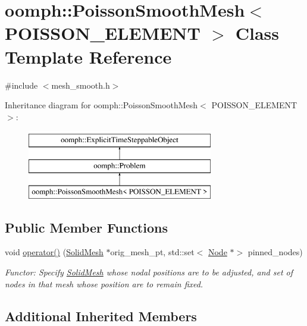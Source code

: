 \hypertarget{classoomph_1_1PoissonSmoothMesh}{}\section{oomph\+:\+:Poisson\+Smooth\+Mesh$<$ P\+O\+I\+S\+S\+O\+N\+\_\+\+E\+L\+E\+M\+E\+NT $>$ Class Template Reference}
\label{classoomph_1_1PoissonSmoothMesh}


{\ttfamily \#include $<$mesh\+\_\+smooth.\+h$>$}

Inheritance diagram for oomph\+:\+:Poisson\+Smooth\+Mesh$<$ P\+O\+I\+S\+S\+O\+N\+\_\+\+E\+L\+E\+M\+E\+NT $>$\+:\begin{figure}[H]
\begin{center}
\leavevmode
\includegraphics[height=3.000000cm]{classoomph_1_1PoissonSmoothMesh}
\end{center}
\end{figure}
\subsection*{Public Member Functions}
\begin{DoxyCompactItemize}
\item 
void \hyperlink{classoomph_1_1PoissonSmoothMesh_a73231d7886dfd0ccc5cc7f7d239d746d}{operator()} (\hyperlink{classoomph_1_1SolidMesh}{Solid\+Mesh} $\ast$orig\+\_\+mesh\+\_\+pt, std\+::set$<$ \hyperlink{classoomph_1_1Node}{Node} $\ast$$>$ pinned\+\_\+nodes)
\begin{DoxyCompactList}\small\item\em Functor\+: Specify \hyperlink{classoomph_1_1SolidMesh}{Solid\+Mesh} whose nodal positions are to be adjusted, and set of nodes in that mesh whose position are to remain fixed. \end{DoxyCompactList}\end{DoxyCompactItemize}
\subsection*{Additional Inherited Members}


